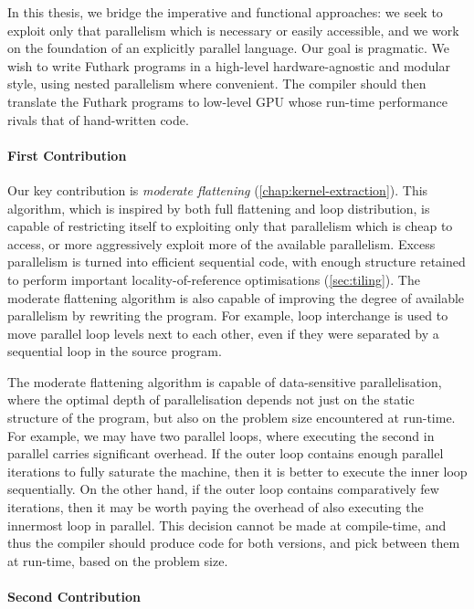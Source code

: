 In this thesis, we bridge the imperative and functional approaches: we
seek to exploit only that parallelism which is necessary or easily
accessible, and we work on the foundation of an explicitly parallel
language.  Our goal is pragmatic.  We wish to write Futhark programs
in a high-level hardware-agnostic and modular style, using nested
parallelism where convenient.  The compiler should then translate the
Futhark programs to low-level GPU whose run-time performance rivals
that of hand-written code.

\paragraph{First Contribution}

Our key contribution is \textit{moderate flattening}
(\cref{chap:kernel-extraction}).  This algorithm, which is inspired by
both full flattening and loop distribution, is capable of restricting
itself to exploiting only that parallelism which is cheap to access,
or more aggressively exploit more of the available parallelism.
Excess parallelism is turned into efficient sequential code, with
enough structure retained to perform important locality-of-reference
optimisations (\cref{sec:tiling}).  The moderate flattening algorithm
is also capable of improving the degree of available parallelism by
rewriting the program.  For example, loop interchange is used to move
parallel loop levels next to each other, even if they were separated
by a sequential loop in the source program.

The moderate flattening algorithm is capable of data-sensitive
parallelisation, where the optimal depth of parallelisation depends
not just on the static structure of the program, but also on the
problem size encountered at run-time.  For example, we may have two
parallel loops, where executing the second in parallel carries
significant overhead.  If the outer loop contains enough parallel
iterations to fully saturate the machine, then it is better to execute
the inner loop sequentially.  On the other hand, if the outer loop
contains comparatively few iterations, then it may be worth paying the
overhead of also executing the innermost loop in parallel.  This
decision cannot be made at compile-time, and thus the compiler should
produce code for both versions, and pick between them at run-time,
based on the problem size.

\paragraph{Second Contribution}

